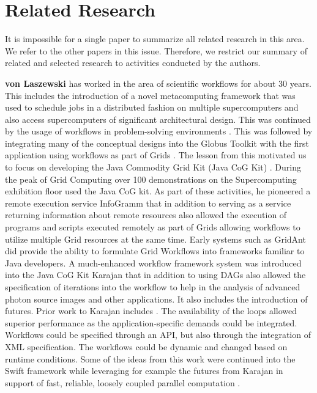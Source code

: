 \documentclass[utf8]{FrontiersinVancouver} %
\begin{document}
\section{Related Research}
\label{sec:related}

It is impossible for a single paper to summarize all related research in this area. We refer to the other papers in this issue. Therefore, we restrict our summary of related and selected research to activities conducted by the authors.

{\bf von Laszewski} has worked in the area of scientific workflows for about 30 years. This includes the introduction of a novel metacomputing framework \citep{las-99-loosely,las-94-ecwmf,las-96-ecwmf} that was used to schedule jobs in a distributed fashion on multiple supercomputers and also access supercomputers of significant architectural design. 
This was continued by the usage of workflows in problem-solving environments \citep{las-01-pse}. This was followed by integrating many of the conceptual designs into the Globus Toolkit with the first application using workflows as part of Grids \citep{las-00-sbc}. The lesson from this motivated us to focus on developing the Java Commodity Grid Kit (Java CoG Kit) \citep{las-06-workcoordination,
las-06-workflow-book,
las-06-exp-a,
las-05-workflowrepo,
las-05-workflow-jgc,
las-05-exp,
las-04-abstraction-j,
las-03-gridcomputing,
las-02-javacog,
las-00-grande,
las-01-cog-concurency}. 
During the peak of Grid Computing over 100 demonstrations on the Supercomputing exhibition floor used the Java CoG kit. As part of these activities, he pioneered a remote execution service InfoGramm 
\citep{las-02-infogram}
that in addition to serving as a service returning information about remote resources also allowed the execution of programs and scripts executed remotely as part of Grids allowing workflows to utilize multiple Grid resources at the same time. Early systems such as GridAnt \citep{las-04-gridant} 
did provide the ability to formulate Grid Workflows into frameworks familiar to Java developers. A much-enhanced workflow framework system was introduced into the  Java CoG Kit Karajan \citep{las-06-workflow-book} that in addition to using DAGs also allowed the specification of iterations into the workflow to help in the analysis of advanced photon source images and other applications. It also includes the introduction of futures. Prior work to Karajan includes \citep{las-04-gridant,las-01-cog-concurency,las-96-ecwmf}. The availability of the loops allowed superior performance as the application-specific demands could be integrated. Workflows could be specified through an API, but also through the integration of XML specification. The workflows could be dynamic and changed based on runtime conditions. Some of the ideas from this work were continued into the Swift framework while leveraging for example the futures from Karajan in support of fast, reliable, loosely coupled parallel computation \citep{las--7-swift}. 
\end{document}
